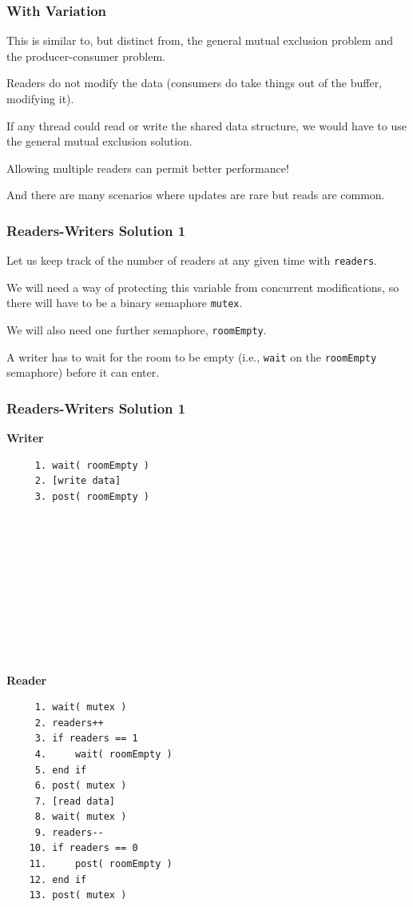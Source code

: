 \begin{frame}
	\frametitle{With Variation}

	This is similar to, but distinct from, the general mutual exclusion problem and the producer-consumer problem.

	Readers do not modify the data (consumers do take things out of the buffer, modifying it).

	If any thread could read or write the shared data structure, we would have to use the general mutual exclusion solution.

	Allowing multiple readers can permit better performance!

	And there are many scenarios where updates are rare but reads are common.

\end{frame}

\begin{frame}
	\frametitle{Readers-Writers Solution 1}
	Let us keep track of the number of readers at any given time with \texttt{readers}.

	We will need a way of protecting this variable from concurrent modifications, so there will have to be a binary semaphore \texttt{mutex}.

	We will also need one further semaphore, \texttt{roomEmpty}.

	A writer has to wait for the room to be empty (i.e., \texttt{wait} on the \texttt{roomEmpty} semaphore) before it can enter.
\end{frame}



\begin{frame}[fragile]
	\frametitle{Readers-Writers Solution 1}

	\begin{multicols}{2}
		\textbf{Writer}
		\begin{verbatim}
	 1. wait( roomEmpty )
	 2. [write data]
	 3. post( roomEmpty )
	 
	 
	 
	 
	 
	 
	 
	 
	 
	 
  \end{verbatim}
		\columnbreak
		\textbf{Reader}
		\begin{verbatim}
	 1. wait( mutex )
	 2. readers++
	 3. if readers == 1
	 4.     wait( roomEmpty )
	 5. end if
	 6. post( mutex )
	 7. [read data]
	 8. wait( mutex )
	 9. readers--
	10. if readers == 0
	11.     post( roomEmpty )
	12. end if
	13. post( mutex )
  \end{verbatim}
	\end{multicols}
	\vspace{-2em}

\end{frame}

